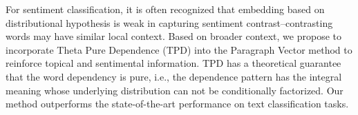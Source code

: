 For sentiment classification, it is often recognized that embedding based on distributional hypothesis is weak in capturing sentiment contrast--contrasting words may have similar local context. Based on broader context, we propose to incorporate Theta Pure Dependence (TPD) into the Paragraph Vector method to reinforce topical and sentimental information. TPD has a theoretical guarantee that the word dependency is pure, i.e., the dependence pattern has the integral meaning whose underlying distribution can not be conditionally factorized. Our method outperforms the state-of-the-art performance on text classification tasks.
